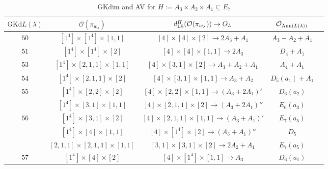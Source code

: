 \documentclass[reqno,12pt]{amsart}
\numberwithin{equation}{section}
\theoremstyle{plain}
\theoremstyle{definition}
\newcommand{\lam}{\lambda}
\renewcommand{\subset}{\subseteq}
\begin{document}
\begin{table}[htbp]\caption{ GKdim and AV for $H:=A_3\times A_3\times A_1\subset E_7$}
	\label{taba3a3a1}
	
	\renewcommand{\arraystretch}{1.5}
	\setlength\tabcolsep{5pt}
	
\footnotesize{	\begin{tabular}{|c|c|c|c|c|}
		\hline $\mathrm{GKd} L(\lambda)$ & $\mathcal{O}({\pi_{w_{\lam}}})$& $d_{\rm LS}^{H}(\mathcal{O}(\pi_{w_\lambda}))\rightarrow O_{L}$ & $\mathcal{O}_{{\rm Ann}(L(\lambda))}$ \\ \hline
$50$ 
&  $ [1^4]\times [1^4]\times [1,1]$  &$[4]\times [4]\times [2]\rightarrow 2A_3+A_1$  &   $A_3+A_2+A_1$ \\
\hline

$51$ 
&  $ [1^4]\times [1^4]\times [2]$  &$[4]\times [4]\times [1,1]\rightarrow 2A_3$  &   $D_4+A_1$ \\
\hline


$53$ 
&  $ [1^4]\times [2,1,1]\times [1,1]$  &$[4]\times [3,1]\times [2]\rightarrow A_3+A_2+A_1$  &   $A_4+A_1$ \\
\hline

$54$ 
&  $ [1^4]\times [2,1,1]\times [2]$  &$[4]\times [3,1]\times [1,1]\rightarrow A_3+A_2$  &   $D_5(a_1)+A_1$ \\
\hline

$55$ 
& $ [1^4]\times [2,2]\times [2]$  &$[4]\times [2,2]\times [1,1]\rightarrow (A_3+2A_1)'$    &   $D_6(a_2)$ \\

& $ [1^4]\times [3,1]\times [1,1]$  &$[4]\times [2,1,1]\times [2]\rightarrow (A_3+2A_1)''$    &   $E_6(a_3)$ \\
\hline


$56$ 
& $ [1^4]\times [3,1]\times [2]$  & \small{ $[4]\times [2,1,1]\times [1,1]\rightarrow (A_3+A_1)'$ } &   $E_7(a_5)$ \\

& $ [1^4]\times [4]\times [1,1]$  &$[4]\times [1^4]\times [2]\rightarrow   (A_3+A_1)''$    &   $D_5$ \\

& \small{$ [2,1,1]\times [2,1,1]\times [1,1]$ } &$[3,1]\times [3,1]\times [2]\rightarrow   2A_2+A_1$   &   $E_7(a_5)$ \\
\hline

$57$ 
& $ [1^4]\times [4]\times [2]$  &$[4]\times [1^4]\times [1,1]\rightarrow A_3$   &   $D_6(a_1)$ \\


\end{tabular}}
\end{table}
\end{document}
